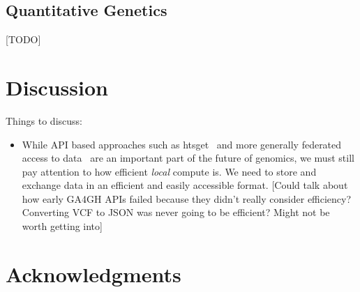 \documentclass[9pt,lineno]{elife}
\begin{document}
\subsection{Quantitative Genetics}

[TODO]

\section{Discussion}

Things to discuss:

\begin{itemize}

\item While API based approaches such as htsget~\citep{kelleher2019htsget}
and more generally federated access to data~\citep{rehm2021ga4gh}
are an important part of the future of genomics, we must still pay
attention to how efficient \emph{local} compute is. We need to
store and exchange data in an efficient and easily accessible
format. [Could talk about
how early GA4GH APIs failed because they didn't really consider
efficiency? Converting VCF to JSON was never going to be efficient?
Might not be worth getting into]

\end{itemize}


\section{Acknowledgments}





\end{document}
